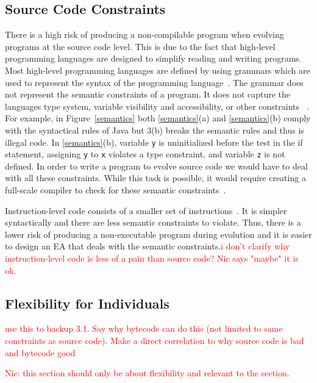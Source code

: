 \documentclass{sig-alternate}
\newcommand{\mycomment}[1]{\textcolor{red}{#1}}
\begin{document}
\subsection{Source Code Constraints}
There is a high risk of producing a non-compilable program when evolving programs at the source code level. This is due to the fact that high-level programming languages are designed to simplify reading and writing programs. Most high-level programming languages are defined by using grammars which are used to represent the syntax of the programming language~\cite{Oracle:2013,Assembly:2010}. The grammar does not represent the semantic constraints of a program. It does not capture the languages type system, variable visibility and accessibility, or other constraints ~\cite{FINCH:2011}. For example, in Figure~\ref{semantics} both \ref{semantics}(a) and \ref{semantics}(b) comply with the syntactical rules of Java but 3(b) breaks the semantic rules and thus is illegal code. In \ref{semantics}(b), variable \texttt{y} is uninitialized before the test in the if statement, assigning \texttt{y} to \texttt{x} violates a type constraint, and variable \texttt{z} is not defined. In order to write a program to evolve source code we would have to deal with all these constraints. While this task is possible, it would require creating a full-scale compiler to check for these semantic constraints~\cite{FINCH:2011}.\par

Instruction-level code consists of a smaller set of instructions~\cite{Assembly:2010}. It is simpler syntactically and there are less semantic constraints to violate. Thus, there is a lower risk of producing a non-executable program during evolution and it is easier to design an EA that deals with the semantic constraints.\mycomment{i don't clarify why instruction-level code is less of a pain than source code? Nic says "maybe" it is ok.}

\subsection{Flexibility  for Individuals}\mycomment{use this to backup 3.1. Say why bytecode can do this (not limited to same constraints as source code). Make a direct correlation to why source code is bad and bytecode good}

\mycomment{Nic: this section should only be about flexibility and relevant to the section.}
\end{document}
